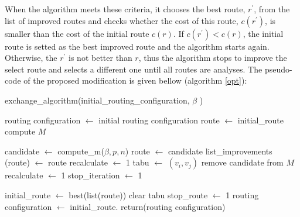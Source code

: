 When the algorithm meets these criteria, it chooses the best route, $ r^{'}$, from the list of improved routes and checks whether the cost of this route, $c( r^{'})$, is smaller than the cost of the initial route $c(r)$. If $c( r^{'}) < c(r)$, the initial route is setted as the best improved route and the algorithm starts again. Otherwise, the $r^{'}$ is not better than $ r$, thus the algorithm stops to improve the select route and selects a different one until all routes are analyses. %
The pseudo-code of the proposed modification is given bellow (algorithm \ref{opt}):


\begin{algorithm}[H]
\caption{exchange\_algorithm(initial\_routing\_configuration, $ \beta$ )}
\label{opt}
\begin{algorithmic}[1]
	\STATE routing configuration $\leftarrow$ initial routing configuration 																	  
	\STATE route $\leftarrow$  initial\_route
	\STATE compute $M$ 
	
	\STATE candidate  $\leftarrow$ compute\_m($\beta,p,n$)
	\STATE route  $\leftarrow$  candidate 
	\STATE list\_improvements (route)  $\leftarrow$  route   
	\STATE recalculate $\leftarrow$ 1 
	\STATE tabu  $\leftarrow$    $(v_{i},v_{j})$  
	\ELSE 
	\STATE  remove candidate	from $M$
	\ENDIF
	\STATE recalculate  $\leftarrow$ 1
	\STATE stop\_iteration  $\leftarrow$ 1
	\ENDIF
	\ENDWHILE
	\ENDWHILE
	
	\STATE initial\_route  $\leftarrow$ best(list(route))
	\STATE clear tabu	    
	\ELSE
	\STATE  stop\_route  $\leftarrow$ 1 
	\ENDIF
	\ENDWHILE
	\STATE routing configuration $\leftarrow$ initial\_route.
	\ENDFOR
	\STATE return(routing configuration) 
\end{algorithmic}

\end{algorithm}






